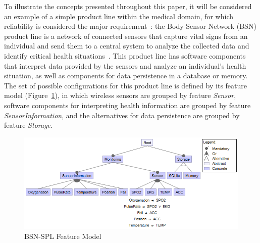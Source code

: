 To illustrate the concepts presented throughout this paper, it will be
considered an example of a simple product line within the medical domain, for
which reliability is considered the major requirement~\cite{Hao:2008bs}: the
Body Sensor Network (BSN) product line is a network of connected sensors that
capture vital signs from an individual and send them to a central system to
analyze the collected data and identify critical health
situations~\cite{rodrigues_modeling_2015}.
This product line has software components that interpret data provided by the
sensors and analyze an individual's health situation, as well as components for
data persistence in a database or memory.  The set of possible configurations
for this product line is defined by its feature model (Figure~\ref{fig:fm}), in
which wireless sensors are grouped by feature \textit{Sensor}, software
components for interpreting health information are grouped by feature
\textit{SensorInformation}, and the alternatives for data persistence are
grouped by feature \textit{Storage}.


\begin{figure}[ht!]
	\centering
	\includegraphics[width=\columnwidth]{./img/fm-full}
	\caption{BSN-SPL Feature Model}
	\label{fig:fm}
\end{figure}



